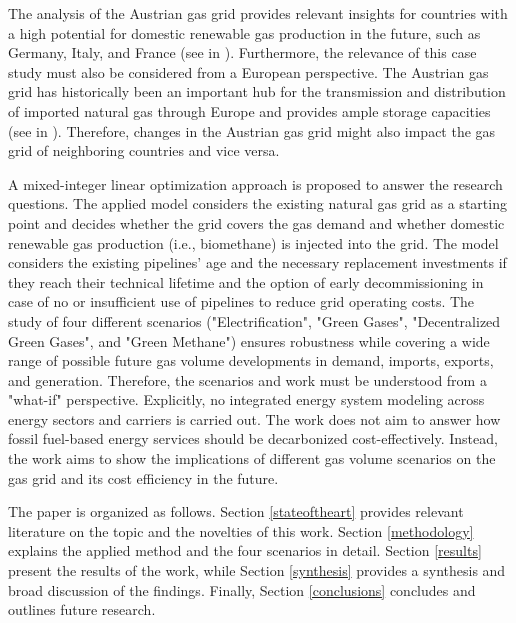 The analysis of the Austrian gas grid provides relevant insights for countries with a high potential for domestic renewable gas production in the future, such as Germany, Italy, and France (see in \cite{scarlat2018biogas}). Furthermore, the relevance of this case study must also be considered from a European perspective. The Austrian gas grid has historically been an important hub for the transmission and distribution of imported natural gas through Europe and provides ample storage capacities (see in \cite{sesini2021strategic}). Therefore, changes in the Austrian gas grid might also impact the gas grid of neighboring countries and vice versa.\vspace{0.3cm}

A mixed-integer linear optimization approach is proposed to answer the research questions. The applied model considers the existing natural gas grid as a starting point and decides whether the grid covers the gas demand and whether domestic renewable gas production (i.e., biomethane) is injected into the grid. The model considers the existing pipelines' age and the necessary replacement investments if they reach their technical lifetime and the option of early decommissioning in case of no or insufficient use of pipelines to reduce grid operating costs. The study of four different scenarios ("Electrification", "Green Gases", "Decentralized Green Gases", and "Green Methane") ensures robustness while covering a wide range of possible future gas volume developments in demand, imports, exports, and generation. Therefore, the scenarios and work must be understood from a "what-if" perspective. Explicitly, no integrated energy system modeling across energy sectors and carriers is carried out. The work does not aim to answer how fossil fuel-based energy services should be decarbonized cost-effectively. Instead, the work aims to show the implications of different gas volume scenarios on the gas grid and its cost efficiency in the future.\vspace{0.3cm}

The paper is organized as follows. Section \ref{stateoftheart} provides relevant literature on the topic and the novelties of this work. Section \ref{methodology} explains the applied method and the four scenarios in detail. Section \ref{results} present the results of the work, while Section \ref{synthesis} provides a synthesis and broad discussion of the findings. Finally, Section \ref{conclusions} concludes and outlines future research.







